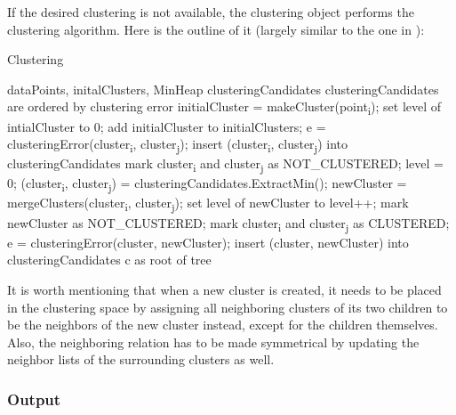 If the desired clustering is not available, the clustering object performs the clustering algorithm. Here is the outline of it (largely similar to the one in \citet{Telea99}):

\begin{algorithm}[H]
\caption{Clustering}
\begin{algorithmic}[1]

\Require dataPoints, initalClusters, MinHeap clusteringCandidates \Comment clusteringCandidates are ordered by clustering error
\Statex
{}
	\State initialCluster = makeCluster(point\textsubscript{i});
    \State set level of intialCluster to 0;
    \State add initialCluster to initialClusters;
\EndFor
\Statex
{}
    	\State e = clusteringError(cluster\textsubscript{i}, cluster\textsubscript{j});
        \State insert (cluster\textsubscript{i}, cluster\textsubscript{j}) into clusteringCandidates
        \State mark cluster\textsubscript{i} and cluster\textsubscript{j} as NOT\_CLUSTERED;
    \EndFor
\EndFor
\Statex
\State level = 0;
	\State (cluster\textsubscript{i}, cluster\textsubscript{j}) = clusteringCandidates.ExtractMin();
    	\State newCluster = mergeClusters(cluster\textsubscript{i}, cluster\textsubscript{j});
        \State set level of newCluster to level++;
		\State mark newCluster as NOT\_CLUSTERED;
        \State mark cluster\textsubscript{i} and cluster\textsubscript{j} as CLUSTERED;
        	\State e = clusteringError(cluster, newCluster);
            \State insert (cluster, newCluster) into clusteringCandidates
        \EndFor
    \EndIf
\EndWhile
\Statex
\Return c as root of tree
\end{algorithmic}
\end{algorithm}

It is worth mentioning that when a new cluster is created, it needs to be placed in the clustering space by assigning all neighboring clusters of its two children to be the neighbors of the new cluster instead, except for the children themselves. Also, the neighboring relation has to be made symmetrical by updating the neighbor lists of the surrounding clusters as well.

\subsubsection{Output}

